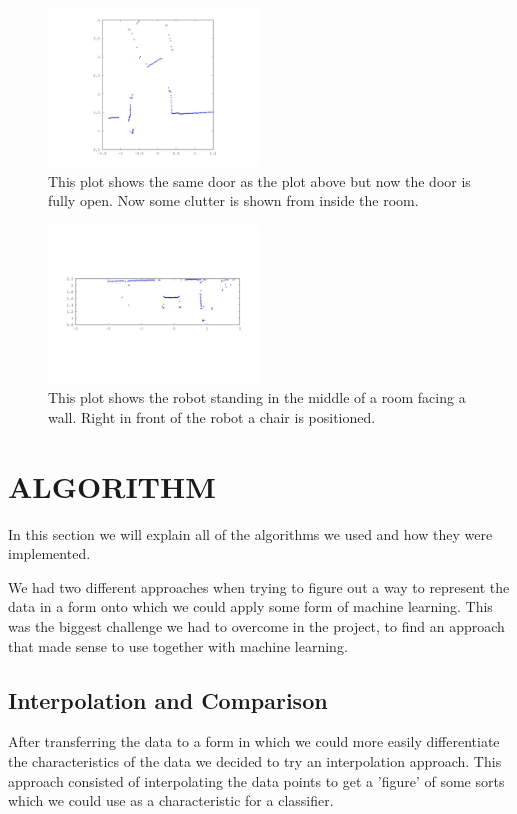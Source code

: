 \documentclass[a4paper, 10pt, conference]{ieeeconf}      %
\begin{document}
\begin{figure}
\centering
\includegraphics[width=0.5\textwidth]{presimg/doorfull.jpg}
\caption{This plot shows the same door as the plot above but now the door is fully open. Now some clutter is shown from inside the room.}
\label{doorfull}
\end{figure}

\begin{figure}
\centering
\includegraphics[width=0.5\textwidth]{presimg/chair.jpg}
\caption{This plot shows the robot standing in the middle of a room facing a wall. Right in front of the robot a chair is positioned.}
\label{chair}
\end{figure}

\section{ALGORITHM}
In this section we will explain all of the algorithms we used and how they were implemented. 

We had two different approaches when trying to figure out a way to represent the data in a form onto which we could apply some form of machine learning. This was the biggest challenge we had to overcome in the project, to find an approach that made sense to use together with machine learning. 

\subsection{Interpolation and Comparison}
After transferring the data to a form in which we could more easily differentiate the characteristics of the data we decided to try an interpolation approach. This approach consisted of interpolating the data points to get a 'figure' of some sorts which we could use as a characteristic for a classifier.
\end{document}
